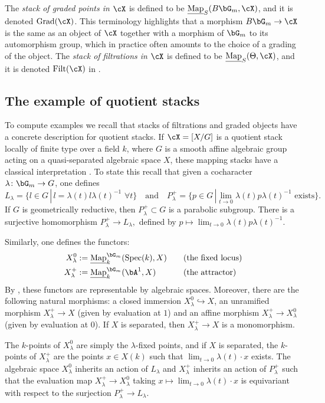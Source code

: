 \documentclass[a4paper]{amsart}
\numberwithin{equation}{section}
\theoremstyle{plain}
\theoremstyle{definition}
\DeclareMathOperator{\Spec}{Spec}
\newcommand{\hookarr}{\hookrightarrow}
\DeclareMathOperator{\Filt}{Filt}
\newcommand{\uMap}{\underline{{\rm Map}}}
\DeclareMathOperator{\Grad}{Grad}
\newcommand{\co}{\colon}
\begin{document}
The \emph{stack of graded points in $\cX$} is defined to be $\uMap_S(B\bG_m,\cX)$, and it is denoted $\Grad(\cX)$. This terminology highlights that a morphism $B\bG_m \to \cX$ is the same as an object of $\cX$ together with a morphism of $\bG_m$ to its automorphism group, which in practice often amounts to the choice of a grading of the object. The \emph{stack of filtrations in $\cX$} is defined to be $\uMap_S(\Theta,\cX)$, and it is denoted $\Filt(\cX)$ in \cite{hlinstability}.

\subsection{The example of quotient stacks}\label{S:drinfeld} To compute examples we recall that   stacks of filtrations and graded objects have a concrete description for quotient stacks.
If $\cX=[X/G]$ is a quotient stack locally of finite type over a field $k$, where $G$ is a smooth {affine} algebraic group acting on a quasi-separated algebraic space $X$, these mapping stacks have a classical interpretation \cite[Thm.~1.4.8]{hlinstability}. To state this recall that given a cocharacter $\lambda \co  \bG_m \to G$, one defines
$$
L_{\lambda} =  \{l \in G \, | \,  l = \lambda(t) l \lambda(t)^{-1} \, \, \forall t\} \quad  \text{and} \quad
P^+_{\lambda} =  \{p \in G \, | \lim_{t \to 0} \lambda(t) p \lambda(t)^{-1} \text{ exists} \}. 
$$
If $G$ is geometrically reductive, then $P^+_{\lambda} \subset G$ is a parabolic subgroup.
There is a surjective homomorphism 
$P^+_{\lambda} \to L_{\lambda},$ defined by $p \mapsto \lim_{t \to 0} \lambda(t) p \lambda(t)^{-1}$.  

Similarly, one defines the functors:
$$\begin{aligned}
	X^0_{\lambda}		& := \uMap_k^{\bG_m}(\Spec(k), X) & \quad & \text{(the fixed locus)}\\
	X^+_{\lambda}  		& := \uMap_k^{\bG_m}(\bA^1, X) & \quad & \text{(the attractor)}
\end{aligned}$$
By  \cite[Thm.~1.4.2]{drinfeld}, 
these functors are representable by algebraic spaces.  Moreover, there are the following natural morphisms:  
a closed immersion $X^0_{\lambda} \hookarr X$,  
an unramified morphism $X^+_{\lambda} \to X$ (given by evaluation at $1$)  and  
an affine \cite[Thm.~2.22]{ahr} morphism $X^+_{\lambda} \to X^0_{\lambda}$ (given by evaluation at $0$). If $X$ is separated, then $X^+_{\lambda} \to X$ is a monomorphism.

The $k$-points of $X^0_{\lambda}$ are simply the $\lambda$-fixed points, and if $X$ is separated, the $k$-points of $X^+_{\lambda}$ are the points $x \in X(k)$ such that $\lim_{t \to 0} \lambda(t) \cdot x$ exists. The algebraic space $X^0_{\lambda}$ inherits an action of $L_{\lambda}$ and $X^+_{\lambda}$ inherits an action of $P^+_{\lambda}$ such that the evaluation map $X^+_{\lambda} \to X^0_{\lambda}$ taking $x \mapsto \lim_{t\to 0}\lambda(t) \cdot x$ is equivariant with respect to the surjection $P^+_{\lambda} \to L_{\lambda}$.
\end{document}
